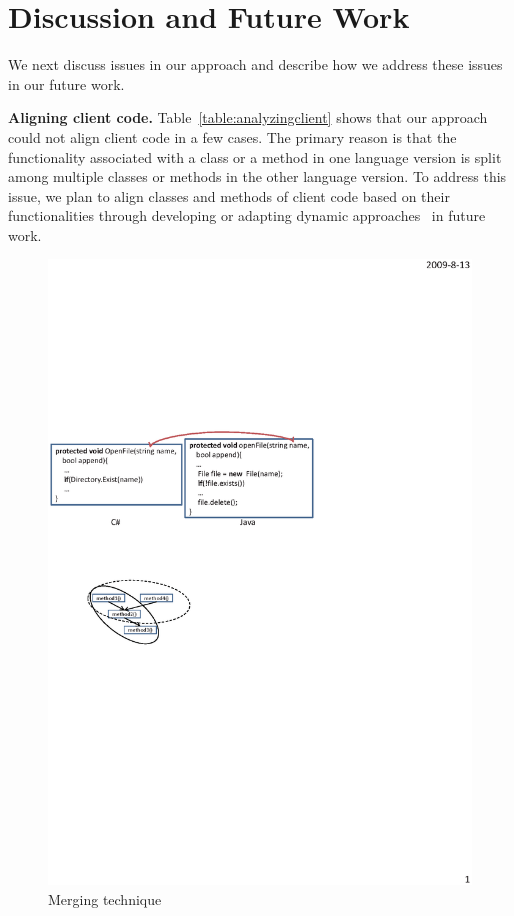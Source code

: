\section{Discussion and Future Work}
\label{sec:discuss}

We next discuss issues in our approach and describe how we address
these issues in our future work.

\textbf{Aligning client code.} Table~\ref{table:analyzingclient}
shows that our approach could not align client code in a few cases.
The primary reason is that the functionality associated with a class
or a method in one language version is split among multiple classes
or methods in the other language version. To address this issue, we
plan to align classes and methods of client code based on their
functionalities through developing or adapting dynamic approaches~\cite{jiang2009automatic} in future work.

\begin{figure}[t]
\centering
\includegraphics[scale=1,clip]{figure/n2n.eps}\vspace*{-3ex}
 \caption{Merging technique}\vspace*{-3.5ex}
 \label{fig:n2n}
\end{figure}

